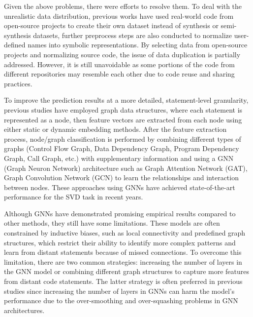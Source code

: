 \documentclass{ieeeaccess}
\begin{document}
\par %
    Given the above problems, there were efforts to resolve them. To deal with the unrealistic data distribution, previous works have used real-world code from open-source projects to create their own dataset\cite{devign, Are, Linevd, VUDENC, cvefixes} instead of synthesis or semi-synthesis datasets\cite{sard, SATE, Draper}, further preprocess steps are also conducted to normalize user-defined names into symbolic representations\cite{vuldeekeeper, vuldeepeeker2, DeepWukong,SySeVR,VulDeeLocator}. By selecting data from open-source projects and normalizing source code, the issue of data duplication is partially addressed. However, it is still unavoidable as some portions of the code from different repositories may resemble each other due to code reuse and sharing practices. 
\par To improve the prediction results at a more detailed, statement-level granularity, previous studies\cite{MVD, Linevd, IVDetect} have employed graph data structures, where each statement is represented as a node, then feature vectors are extracted from each node using either static\cite{glove, doc2vec, word2vec} or dynamic embedding\cite{codebert} methods. After the feature extraction process, node/graph classification is performed by combining different types of graphs (Control Flow Graph, Data Dependency Graph, Program Dependency Graph, Call Graph, etc.) with supplementary information  and using a GNN (Graph Neuron Network) architecture such as Graph  Attention Network (GAT)\cite{GAT},  Graph Convolution Network (GCN)\cite{GCN} to learn the relationships and interaction between nodes. These approaches using GNNs have achieved state-of-the-art performance for the SVD task in recent years.

\par Although GNNs have demonstrated promising empirical results compared to other methods, they still have some limitations. These models are often constrained by inductive biases, such as local connectivity and predefined graph structures, which restrict their ability to identify more complex patterns and learn from distant statements because of missed connections. To overcome this limitation, there are two common strategies: increasing the number of layers in the GNN model or combining different graph structures to capture more features from distant code statements. The latter strategy is often preferred in previous studies \cite{Linevd, DeepWukong, MVD, IVDetect, Are} since increasing the number of layers in GNNs can harm the model's performance due to the over-smoothing \cite{over_smooth} and over-squashing\cite{over_squash} problems in GNN  architectures. 
\end{document}
